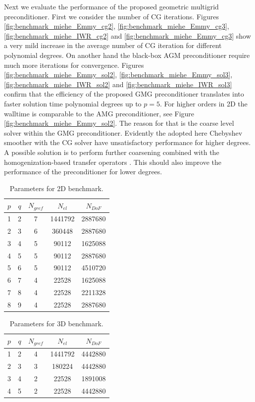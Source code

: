 \documentclass[preprint,12pt,times]{elsarticle}
\begin{document}
Next we evaluate the performance of the proposed geometric multigrid preconditioner. First we consider the number of CG iterations.
Figures \ref{fig:benchmark_miehe_Emmy_cg2}, \ref{fig:benchmark_miehe_Emmy_cg3}, \ref{fig:benchmark_miehe_IWR_cg2} and \ref{fig:benchmark_miehe_Emmy_cg3} show a very mild increase in the average number of CG iteration for different polynomial degrees. On another hand the black-box AGM preconditioner require much more iterations for convergence.
Figures \ref{fig:benchmark_miehe_Emmy_sol2}, \ref{fig:benchmark_miehe_Emmy_sol3}, \ref{fig:benchmark_miehe_IWR_sol2} and \ref{fig:benchmark_miehe_IWR_sol3} confirm that the efficiency of the proposed GMG preconditioner translates into faster solution time polynomial degrees up to $p=5$. For higher orders in 2D the walltime is comparable to the AMG preconditioner, see Figure \ref{fig:benchmark_miehe_Emmy_sol2}.
The reason for that is the coarse level solver within the GMG preconditioner. Evidently the adopted here Chebyshev smoother with the CG solver have unsatisfactory performance for higher degrees.
A possible solution is to perform further coarsening combined with the homogenization-based transfer operators \cite{Miehe2007}. This should also improve the performance of the preconditioner for lower degrees.

\begin{table}
  \centering
  \begin{tabular}{ccccc}
  \hline
    $p$ & $q$ & $N_{gref}$ & $N_{el}$ & $N_{DoF}$ \\
  \hline
    1 & 2 & 7 & 1441792 & 2887680 \\
    2 & 3 & 6 & 360448 & 2887680 \\
    3 & 4 & 5 & 90112 & 1625088 \\
    4 & 5 & 5 & 90112 & 2887680 \\
    5 & 6 & 5 & 90112 & 4510720 \\
    6 & 7 & 4 & 22528 & 1625088 \\
    7 & 8 & 4 & 22528 & 2211328 \\
    8 & 9 & 4 & 22528 & 2887680 \\
  \hline
  \end{tabular}
  \caption{Parameters for 2D benchmark.
  }
  \label{tab:input_parameters_2d}
\end{table}

\begin{table}
  \centering
  \begin{tabular}{ccccc}
  \hline
    $p$ & $q$ & $N_{gref}$ & $N_{el}$ & $N_{DoF}$ \\
  \hline
    1 & 2 & 4 & 1441792 & 4442880 \\
    2 & 3 & 3 & 180224 & 4442880 \\
    3 & 4 & 2 & 22528 & 1891008 \\
    4 & 5 & 2 & 22528 & 4442880 \\
  \hline
  \end{tabular}
  \caption{Parameters for 3D benchmark.
  }
  \label{tab:input_parameters_3d}
\end{table}
\end{document}
